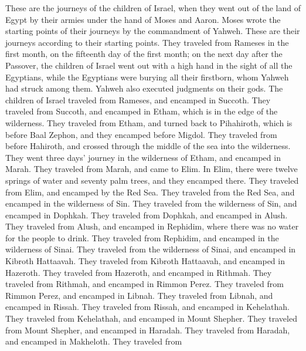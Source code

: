  These are the journeys of the children of Israel, when
they went out of the land of Egypt by their armies under the hand of
Moses and Aaron.  Moses wrote the starting points of their
journeys by the commandment of Yahweh. These are their journeys
according to their starting points.  They traveled from
Rameses in the first month, on the fifteenth day of the first month; on
the next day after the Passover, the children of Israel went out with a
high hand in the sight of all the Egyptians,  while the
Egyptians were burying all their firstborn, whom Yahweh had struck among
them. Yahweh also executed judgments on their gods.  The
children of Israel traveled from Rameses, and encamped in Succoth.
 They traveled from Succoth, and encamped in Etham, which
is in the edge of the wilderness.  They traveled from
Etham, and turned back to Pihahiroth, which is before Baal Zephon, and
they encamped before Migdol.  They traveled from before
Hahiroth, and crossed through the middle of the sea into the wilderness.
They went three days' journey in the wilderness of Etham, and encamped
in Marah.  They traveled from Marah, and came to Elim. In
Elim, there were twelve springs of water and seventy palm trees, and
they encamped there.  They traveled from Elim, and
encamped by the Red Sea.  They traveled from the Red Sea,
and encamped in the wilderness of Sin.  They traveled
from the wilderness of Sin, and encamped in Dophkah. 
They traveled from Dophkah, and encamped in Alush.  They
traveled from Alush, and encamped in Rephidim, where there was no water
for the people to drink.  They traveled from Rephidim,
and encamped in the wilderness of Sinai.  They traveled
from the wilderness of Sinai, and encamped in Kibroth Hattaavah.
 They traveled from Kibroth Hattaavah, and encamped in
Hazeroth.  They traveled from Hazeroth, and encamped in
Rithmah.  They traveled from Rithmah, and encamped in
Rimmon Perez.  They traveled from Rimmon Perez, and
encamped in Libnah.  They traveled from Libnah, and
encamped in Rissah.  They traveled from Rissah, and
encamped in Kehelathah.  They traveled from Kehelathah,
and encamped in Mount Shepher.  They traveled from Mount
Shepher, and encamped in Haradah.  They traveled from
Haradah, and encamped in Makheloth.  They traveled from
